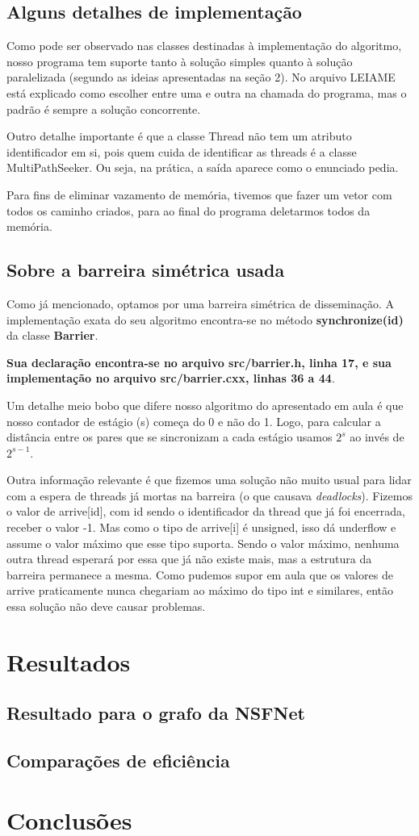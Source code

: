 \documentclass[a4paper,11pt]{article}
\begin{document}
  \subsection{Alguns detalhes de implementação}
    Como pode ser observado nas classes destinadas à implementação do algoritmo,
    nosso programa tem suporte tanto à solução simples quanto à solução
    paralelizada (segundo as ideias apresentadas na seção 2). No arquivo LEIAME
    está explicado como escolher entre uma e outra na chamada do programa, mas
    o padrão é sempre a solução concorrente.

    Outro detalhe importante é que a classe Thread não tem um atributo
    identificador em si, pois quem cuida de identificar as threads é a classe
    MultiPathSeeker. Ou seja, na prática, a saída aparece como o enunciado
    pedia.

    Para fins de eliminar vazamento de memória, tivemos que fazer um vetor com
    todos os caminho criados, para ao final do programa deletarmos todos da
    memória.

  \subsection{Sobre a barreira simétrica usada}
    Como já mencionado, optamos por uma barreira simétrica de disseminação. A
    implementação exata do seu algoritmo encontra-se no método
    \textbf{synchronize(id)} da classe \textbf{Barrier}.

    \textbf{Sua declaração encontra-se no arquivo src/barrier.h, linha 17, e sua
    implementação no arquivo src/barrier.cxx, linhas 36 a 44}.

    Um detalhe meio bobo que difere nosso algoritmo do apresentado em aula é que
    nosso contador de estágio (s) começa do 0 e não do 1. Logo, para calcular a
    distância entre os pares que se sincronizam a cada estágio usamos $2^s$ ao
    invés de $2^{s-1}$.

    Outra informação relevante é que fizemos uma solução não muito usual para
    lidar com a espera de threads já mortas na barreira (o que causava
    \textit{deadlocks}). Fizemos o valor de arrive[id], com id sendo o
    identificador da thread que já foi encerrada, receber o valor -1. Mas como
    o tipo de arrive[i] é unsigned, isso dá underflow e assume o valor máximo
    que esse tipo suporta. Sendo o valor máximo, nenhuma outra thread esperará
    por essa que já não existe mais, mas a estrutura da barreira permanece a
    mesma. Como pudemos supor em aula que os valores de arrive praticamente
    nunca chegariam ao máximo do tipo int e similares, então essa solução não
    deve causar problemas.

\section{Resultados}

  \subsection{Resultado para o grafo da NSFNet}

  \subsection{Comparações de eficiência}

\section{Conclusões}
\end{document}
